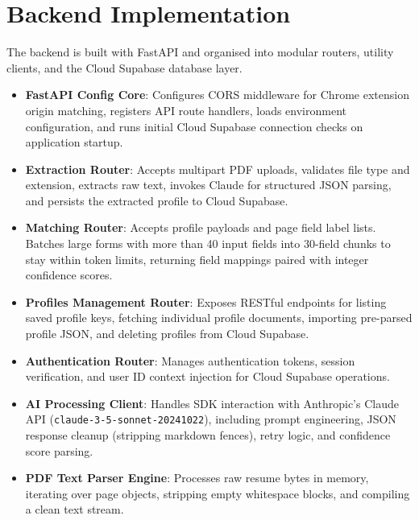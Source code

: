 \documentclass[12pt,a4paper]{report}
\begin{document}
\section{Backend Implementation}
The backend is built with FastAPI and organised into modular routers, utility clients, and the Cloud Supabase database layer.
\begin{itemize}
    \item \textbf{FastAPI Config Core}: Configures CORS middleware for Chrome extension origin matching, registers API route handlers, loads environment configuration, and runs initial Cloud Supabase connection checks on application startup.
    \item \textbf{Extraction Router}: Accepts multipart PDF uploads, validates file type and extension, extracts raw text, invokes Claude for structured JSON parsing, and persists the extracted profile to Cloud Supabase.
    \item \textbf{Matching Router}: Accepts profile payloads and page field label lists. Batches large forms with more than 40 input fields into 30-field chunks to stay within token limits, returning field mappings paired with integer confidence scores.
    \item \textbf{Profiles Management Router}: Exposes RESTful endpoints for listing saved profile keys, fetching individual profile documents, importing pre-parsed profile JSON, and deleting profiles from Cloud Supabase.
    \item \textbf{Authentication Router}: Manages authentication tokens, session verification, and user ID context injection for Cloud Supabase operations.
    \item \textbf{AI Processing Client}: Handles SDK interaction with Anthropic's Claude API (\texttt{claude-3-5-sonnet-20241022}), including prompt engineering, JSON response cleanup (stripping markdown fences), retry logic, and confidence score parsing.
    \item \textbf{PDF Text Parser Engine}: Processes raw resume bytes in memory, iterating over page objects, stripping empty whitespace blocks, and compiling a clean text stream.
\end{itemize}
\end{document}
